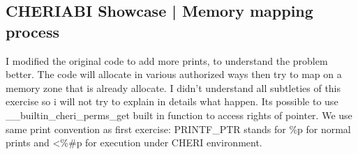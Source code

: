 \documentclass[a4paper, 11pt]{article}
\begin{document}
	\subsection{CHERIABI Showcase | Memory mapping process}
		I modified the original code to add more prints, to understand the problem better. The code will allocate in various authorized ways then try to map on a memory zone that is already allocate.
		I didn't understand all subtleties of this exercise so i will not try to explain in details what happen.
		Its possible to use \_\_builtin\_cheri\_perms\_get built in function to access rights of pointer. 
		We use same print convention as first exercise: PRINTF\_PTR stands for \%p for normal prints and <\%\#p for execution under CHERI environment.
		
	
	
	
\end{document}
